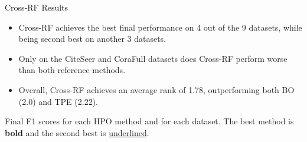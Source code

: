 \documentclass{beamer}
\newlength{\colwidth}
\begin{document}
\begin{frame}[fragile,t]
\begin{columns}[t]
\begin{column}{\colwidth}
		\begin{block}{Cross-RF Results}
			\begin{itemize}
				\item Cross-RF achieves the best final performance on 4 out of the 9 datasets, while being second best on another 3 datasets.
				\item Only on the CiteSeer and CoraFull datasets does Cross-RF perform worse than both reference methods.
				\item Overall, Cross-RF achieves an average rank of 1.78, outperforming both BO (2.0) and TPE (2.22).
			\end{itemize}

			\begin{center}
			\end{center}

			Final F1 scores for each HPO method and for each dataset. The best method is \textbf{bold} and the second best is \underline{underlined}.
		\end{block}


\end{column}
\end{columns}
\end{frame}
\end{document}
